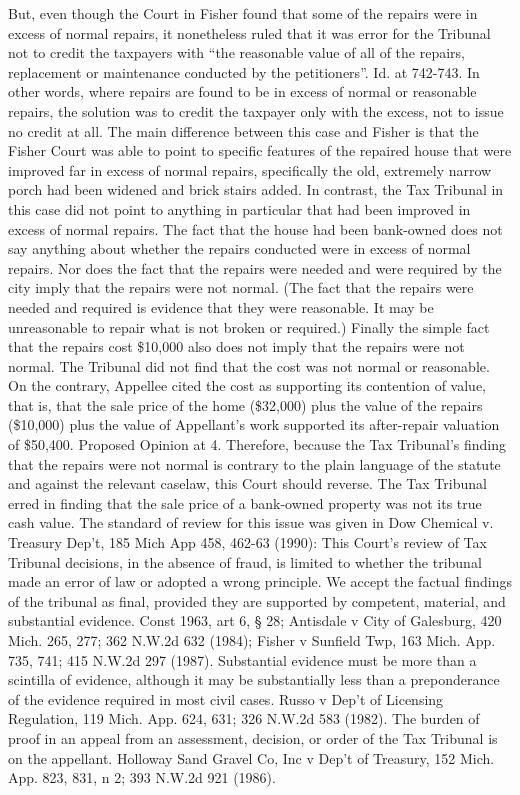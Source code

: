But, even though the Court in Fisher found that some of the repairs were in excess of normal repairs, it nonetheless ruled that it was error for the Tribunal not to credit the taxpayers with ``the reasonable value of all of the repairs, replacement or maintenance conducted by the petitioners''. Id. at 742-743. In other words, where repairs are found to be in excess of normal or reasonable repairs, the solution was to credit the taxpayer only with the excess, not to issue no credit at all.
The main difference between this case and Fisher is that the Fisher Court was able to point to specific features of the repaired house that were improved far in excess of normal repairs, specifically the old, extremely narrow porch had been widened and brick stairs added. In contrast, the Tax Tribunal in this case did not point to anything in particular that had been improved in excess of normal repairs. The fact that the house had been bank-owned does not say anything about whether the repairs conducted were in excess of normal repairs. Nor does the fact that the repairs were needed and were required by the city imply that the repairs were not normal. (The fact that the repairs were needed and required is evidence that they were reasonable. It may be unreasonable to repair what is not broken or required.) Finally the simple fact that the repairs cost \$10,000 also does not imply that the repairs were not normal. The Tribunal did not find that the cost was not normal or reasonable. On the contrary, Appellee cited the cost as supporting its contention of value, that is, that the sale price of the home (\$32,000) plus the value of the repairs (\$10,000) plus the value of Appellant's work supported its after-repair valuation of \$50,400. Proposed Opinion at 4. 
Therefore, because the Tax Tribunal's finding that the repairs were not normal is contrary to the plain language of the statute and against the relevant caselaw, this Court should reverse.
The Tax Tribunal erred in finding that the sale price of a bank-owned property was not its true cash value.
The standard of review for this issue was given in Dow Chemical v. Treasury Dep't, 185 Mich App 458, 462-63 (1990): 
This Court's review of Tax Tribunal decisions, in the absence of fraud, is limited to whether the tribunal made an error of law or adopted a wrong principle. We accept the factual findings of the tribunal as final, provided they are supported by competent, material, and substantial evidence. Const 1963, art 6, § 28; Antisdale v City of Galesburg, 420 Mich. 265, 277; 362 N.W.2d 632 (1984); Fisher v Sunfield Twp, 163 Mich. App. 735, 741; 415 N.W.2d 297 (1987). Substantial evidence must be more than a scintilla of evidence, although it may be substantially less than a preponderance of the evidence required in most civil cases. Russo v Dep't of Licensing Regulation, 119 Mich. App. 624, 631; 326 N.W.2d 583 (1982). The burden of proof in an appeal from an assessment, decision, or order of the Tax Tribunal is on the appellant. Holloway Sand Gravel Co, Inc v Dep't of Treasury, 152 Mich. App. 823, 831, n 2; 393 N.W.2d 921 (1986).
 
